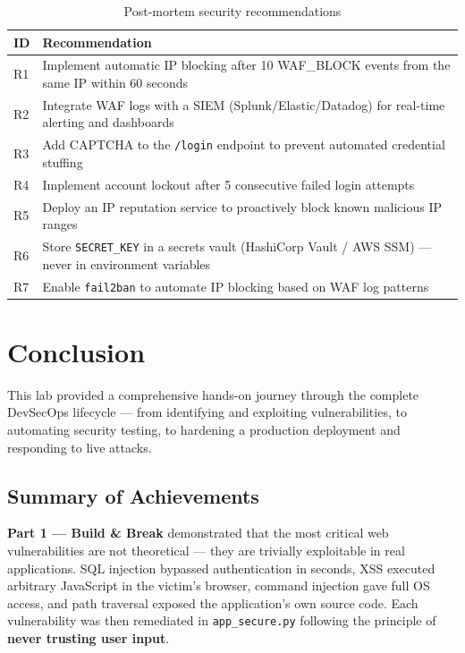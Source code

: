 \documentclass[12pt,a4paper]{report}
\begin{document}
\begin{table}[H]
\centering
\begin{tabularx}{\textwidth}{l X}
\toprule
\textbf{ID} & \textbf{Recommendation} \\
\midrule
R1 & Implement automatic IP blocking after 10 WAF\_BLOCK events from the same IP within 60 seconds \\
R2 & Integrate WAF logs with a SIEM (Splunk/Elastic/Datadog) for real-time alerting and dashboards \\
R3 & Add CAPTCHA to the \texttt{/login} endpoint to prevent automated credential stuffing \\
R4 & Implement account lockout after 5 consecutive failed login attempts \\
R5 & Deploy an IP reputation service to proactively block known malicious IP ranges \\
R6 & Store \texttt{SECRET\_KEY} in a secrets vault (HashiCorp Vault / AWS SSM) — never in environment variables \\
R7 & Enable \texttt{fail2ban} to automate IP blocking based on WAF log patterns \\
\bottomrule
\end{tabularx}
\caption{Post-mortem security recommendations}
\end{table}
\chapter{Conclusion}

This lab provided a comprehensive hands-on journey through the complete DevSecOps lifecycle — from identifying and exploiting vulnerabilities, to automating security testing, to hardening a production deployment and responding to live attacks.

\section{Summary of Achievements}

\textbf{Part 1 — Build \& Break} demonstrated that the most critical web vulnerabilities are not theoretical — they are trivially exploitable in real applications. SQL injection bypassed authentication in seconds, XSS executed arbitrary JavaScript in the victim's browser, command injection gave full OS access, and path traversal exposed the application's own source code. Each vulnerability was then remediated in \texttt{app\_secure.py} following the principle of \textbf{never trusting user input}.
\end{document}
